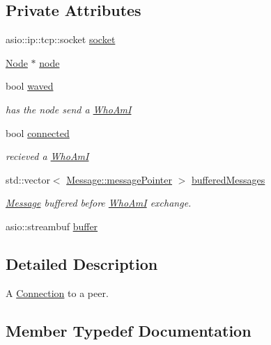 \subsection*{Private Attributes}
\begin{DoxyCompactItemize}
\item 
asio\+::ip\+::tcp\+::socket \mbox{\hyperlink{classConnection_a8b4cf76de02e4eaa6a2afdc65c42cfdc}{socket}}
\item 
\mbox{\hyperlink{classNode}{Node}} $\ast$ \mbox{\hyperlink{classConnection_a0e90a6ef9361901f3d7c25e00d0a2016}{node}}
\item 
bool \mbox{\hyperlink{classConnection_ac8ec569c3d8e883446c1498d6b0fa425}{waved}}
\begin{DoxyCompactList}\small\item\em has the node send a \mbox{\hyperlink{classWhoAmI}{Who\+AmI}} \end{DoxyCompactList}\item 
bool \mbox{\hyperlink{classConnection_a1445f1ca4d7fd2155a7de480340b370a}{connected}}
\begin{DoxyCompactList}\small\item\em recieved a \mbox{\hyperlink{classWhoAmI}{Who\+AmI}} \end{DoxyCompactList}\item 
std\+::vector$<$ \mbox{\hyperlink{classMessage_a3f7f2aa1058cb5f0b74a1fbb7fcd00e5}{Message\+::message\+Pointer}} $>$ \mbox{\hyperlink{classConnection_ad5f7e4d6f209106c33e9e996a0c49932}{buffered\+Messages}}
\begin{DoxyCompactList}\small\item\em \mbox{\hyperlink{classMessage}{Message}} buffered before \mbox{\hyperlink{classWhoAmI}{Who\+AmI}} exchange. \end{DoxyCompactList}\item 
asio\+::streambuf \mbox{\hyperlink{classConnection_a99e0a006406f126fc4c538ba71532397}{buffer}}
\end{DoxyCompactItemize}


\subsection{Detailed Description}
A \mbox{\hyperlink{classConnection}{Connection}} to a peer. 

\subsection{Member Typedef Documentation}
\mbox{\label{classConnection_a1bb6cd8924ff091e9b053e3368735c9c}} 
